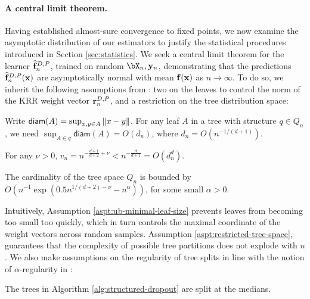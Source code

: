 \vspace{-1ex}
\paragraph{A central limit theorem.} Having established almost-sure convergence to fixed points, we now examine the asymptotic distribution of our estimators to justify the statistical procedures introduced in Section \ref{sec:statistics}. We seek a central limit theorem for the learner $\widehat{\mathbf{f}}_n^{D,P}$, trained on random $\bX_n, \by_n$, demonstrating that the predictions $\widehat{\mathbf{f}}_n^{D,P}(\mathbf{x})$ 
are asymptotically normal with mean $\mathbf{f}(\mathbf{x})$ as $n \to \infty$. To do so, we inherit the following assumptions from \cite{zhou2022boulevard}: two on the leaves to control the norm of the KRR weight vector $\mathbf{r}_n^{D,P}$, and a restriction on the tree distribution space:
\begin{aspt}
    \label{aspt:leaf-diameter}
    Write $\mathsf{diam}(A)=\sup_{x,y\in A}\left\|x-y\right\|$. For any leaf $A$ in a tree with structure $q\in Q_n$, we need $\sup_{A \in q} \mathsf{diam}(A) =  O(d_n)$, where $d_n = O(n^{-{1}/{(d+1)}})$.
\end{aspt}
\vspace{-1ex}
\begin{aspt}
    \label{aspt:ub-minimal-leaf-size}
    For any $\nu >0$, \(v_n =n^{-\frac{d+1}{d+2}+\nu}<n^{-\frac{d}{d+1}}=O(d_n^d)\).
\end{aspt}
\begin{aspt}
    \label{aspt:restricted-tree-space}
    The cardinality of the tree space $Q_n$ is bounded by $O(n^{-1} \exp(0.5 n^{{1}/{(d+2)}-\nu} - n^{\alpha}))$, for some small $\alpha > 0$.
\end{aspt}
\vspace{-1ex}
Intuitively, Assumption \ref{aspt:ub-minimal-leaf-size} prevents leaves from becoming too small too quickly, which in turn controls the maximal coordinate of the weight vectors across random samples. Assumption \ref{aspt:restricted-tree-space}, guarantees that the complexity of possible tree partitions does not explode with \(n\). We also make assumptions on the regularity of tree splits in line with the notion of $\alpha$-regularity in \cite{athey2018generalizedrandomforests}:
\vspace{-1ex}
\begin{aspt}
    \label{aspt:median-trees}
    The trees in Algorithm \ref{alg:structured-dropout} are split at the medians.
\end{aspt}
